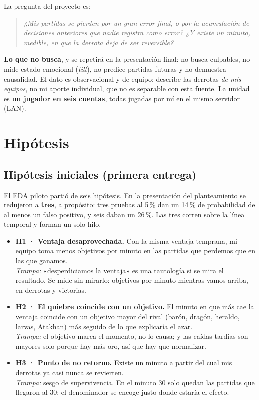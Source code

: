 \documentclass[11pt,letterpaper]{article}
\begin{document}
\noindent La pregunta del proyecto es:
\begin{quote}
\emph{¿Mis partidas se pierden por un gran error final, o por la acumulación de
decisiones anteriores que nadie registra como error? ¿Y existe un minuto, medible,
en que la derrota deja de ser reversible?}
\end{quote}

\noindent \textbf{Lo que no busca}, y se repetirá en la presentación final: no busca
culpables, no mide estado emocional (\emph{tilt}), no predice partidas futuras y no
demuestra causalidad. El dato es observacional y de equipo: describe las derrotas
\emph{de mis equipos}, no mi aporte individual, que no es separable con esta fuente.
La unidad es \textbf{un jugador en seis cuentas}, todas jugadas por mí en el mismo
servidor (LAN).

\section{Hipótesis}
\label{sec:hip}

\subsection{Hipótesis iniciales (primera entrega)}

El EDA piloto partió de seis hipótesis. En la presentación del planteamiento se
redujeron a \textbf{tres}, a propósito: tres pruebas al 5\,\% dan un 14\,\% de
probabilidad de al menos un falso positivo, y seis daban un 26\,\%. Las tres corren
sobre la línea temporal y forman un solo hilo.

\begin{itemize}[leftmargin=1.4em,itemsep=.45em]
  \item \textbf{H1 · Ventaja desaprovechada.} Con la misma ventaja temprana, mi equipo
        toma menos objetivos por minuto en las partidas que perdemos que en las que
        ganamos.\\
        \emph{Trampa:} «desperdiciamos la ventaja» es una tautología si se mira el
        resultado. Se mide sin mirarlo: objetivos por minuto mientras vamos arriba,
        en derrotas y victorias.
  \item \textbf{H2 · El quiebre coincide con un objetivo.} El minuto en que más cae la
        ventaja coincide con un objetivo mayor del rival (barón, dragón, heraldo,
        larvas, Atakhan) más seguido de lo que explicaría el azar.\\
        \emph{Trampa:} el objetivo marca el momento, no lo causa; y las caídas
        tardías son mayores solo porque hay más oro, así que hay que normalizar.
  \item \textbf{H3 · Punto de no retorno.} Existe un minuto a partir del cual mis
        derrotas ya casi nunca se revierten.\\
        \emph{Trampa:} sesgo de supervivencia. En el minuto 30 solo quedan las
        partidas que llegaron al 30; el denominador se encoge justo donde estaría el
        efecto.
\end{itemize}
\end{document}
